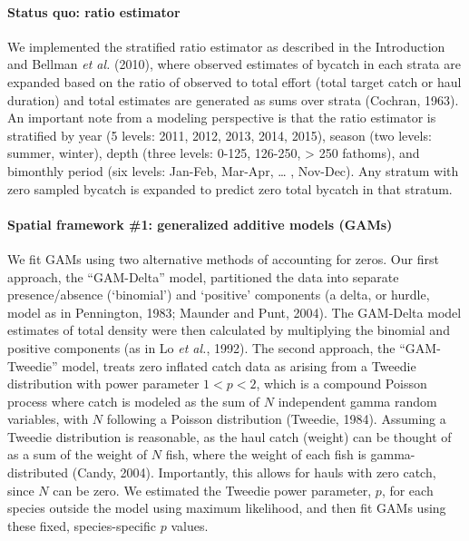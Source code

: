 \documentclass[]{article}
\let\oldparagraph\paragraph
\renewcommand{\paragraph}[1]{\oldparagraph{#1}\mbox{}}
\begin{document}
\hypertarget{status-quo-ratio-estimator}{%
\paragraph{Status quo: ratio
estimator}\label{status-quo-ratio-estimator}}

We implemented the stratified ratio estimator as described in the
Introduction and Bellman \emph{et al.} (2010), where observed estimates
of bycatch in each strata are expanded based on the ratio of observed to
total effort (total target catch or haul duration) and total estimates
are generated as sums over strata (Cochran, 1963). An important note
from a modeling perspective is that the ratio estimator is stratified by
year (5 levels: 2011, 2012, 2013, 2014, 2015), season (two levels:
summer, winter), depth (three levels: 0-125, 126-250, \textgreater{} 250
fathoms), and bimonthly period (six levels: Jan-Feb, Mar-Apr, \ldots{} ,
Nov-Dec). Any stratum with zero sampled bycatch is expanded to predict
zero total bycatch in that stratum.

\hypertarget{spatial-framework-1-generalized-additive-models-gams}{%
\paragraph{Spatial framework \#1: generalized additive models
(GAMs)}\label{spatial-framework-1-generalized-additive-models-gams}}

We fit GAMs using two alternative methods of accounting for zeros. Our
first approach, the ``GAM-Delta'' model, partitioned the data into
separate presence/absence (`binomial') and `positive' components (a
delta, or hurdle, model as in Pennington, 1983; Maunder and Punt, 2004).
The GAM-Delta model estimates of total density were then calculated by
multiplying the binomial and positive components (as in Lo \emph{et
al.}, 1992). The second approach, the ``GAM-Tweedie'' model, treats zero
inflated catch data as arising from a Tweedie distribution with power
parameter \(1 < p < 2\), which is a compound Poisson process where catch
is modeled as the sum of \(N\) independent gamma random variables, with
\(N\) following a Poisson distribution (Tweedie, 1984). Assuming a
Tweedie distribution is reasonable, as the haul catch (weight) can be
thought of as a sum of the weight of \(N\) fish, where the weight of
each fish is gamma-distributed (Candy, 2004). Importantly, this allows
for hauls with zero catch, since \(N\) can be zero. We estimated the
Tweedie power parameter, \(p\), for each species outside the model using
maximum likelihood, and then fit GAMs using these fixed,
species-specific \(p\) values.
\end{document}
